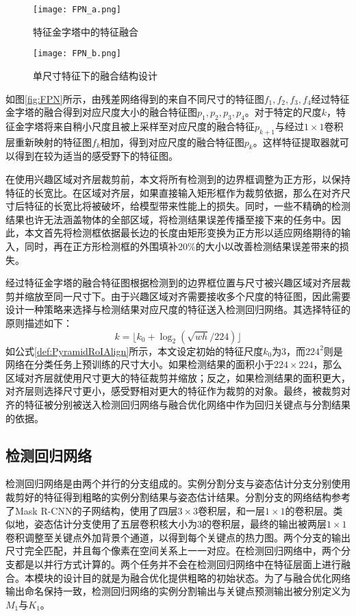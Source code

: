 \begin{figure*}[htbp]	
	\centering
	\begin{subfigure}[b]{0.4\textwidth}
		\texttt{[image: FPN\_a.png]}
		\caption{特征金字塔中的特征融合}
	\end{subfigure}
	\hskip1.5cm
	\begin{subfigure}[b]{0.4\textwidth}
		\texttt{[image: FPN\_b.png]}
		\caption{单尺寸特征下的融合结构设计}
	\end{subfigure}
	\caption{特征金字塔中的结构设计}
	\label{fig:FPN}
\end{figure*}

如图\ref{fig:FPN}所示，由残差网络得到的来自不同尺寸的特征图$f_1, f_2, f_3, f_4$经过特征金字塔的融合得到对应尺度大小的融合特征图$p_1, p_2, p_3, p_4$。对于特定的尺度$k$，特征金字塔将来自稍小尺度且被上采样至对应尺度的融合特征$p_{k+1}$与经过$1\times1$卷积层重新映射的特征图$f_k$相加，得到对应尺度的融合特征图$p_k$。这样特征提取器就可以得到在较为适当的感受野下的特征图。

在使用兴趣区域对齐层裁剪前，本文将所有检测到的边界框调整为正方形，以保持特征的长宽比。在区域对齐层，如果直接输入矩形框作为裁剪依据，那么在对齐尺寸后特征的长宽比将被破坏，给模型带来性能上的损失。同时，一些不精确的检测结果也许无法涵盖物体的全部区域，将检测结果误差传播至接下来的任务中。因此，本文首先将检测框依据最长边的长度由矩形变换为正方形以适应网络期待的输入，同时，再在正方形检测框的外围填补20\%的大小以改善检测结果误差带来的损失。

经过特征金字塔的融合特征图根据检测到的边界框位置与尺寸被兴趣区域对齐层裁剪并缩放至同一尺寸下。由于兴趣区域对齐需要接收多个尺度的特征图，因此需要设计一种策略来选择与检测结果对应尺度的特征送入检测回归网络。其选择特征的原则描述如下：
\begin{equation}
\label{def:PyramidRoIAlign}
k =\lfloor k_0 + \log_{2}(\sqrt{wh} / 224) \rfloor
\end{equation}
如公式\eqref{def:PyramidRoIAlign}所示，本文设定初始的特征尺度$k_0$为3，而$224^2$则是网络在分类任务上预训练的尺寸大小。如果检测结果的面积小于$224\times224$，那么区域对齐层就使用尺寸更大的特征裁剪并缩放；反之，如果检测结果的面积更大，对齐层则选择尺寸更小，感受野相对更大的特征作为裁剪的对象。最终，被裁剪对齐的特征被分别被送入检测回归网络与融合优化网络中作为回归关键点与分割结果的依据。

\subsection{检测回归网络}
\label{subsec:detection}
检测回归网络是由两个并行的分支组成的。实例分割分支与姿态估计分支分别使用裁剪好的特征得到粗略的实例分割结果与姿态估计结果。分割分支的网络结构参考了Mask R-CNN\cite{He2017Mask}的子网结构，使用了四层$3\times3$卷积层，和一层$1\times1$的卷积层。类似地，姿态估计分支使用了五层卷积核大小为3的卷积层，最终的输出被两层$1\times1$卷积调整至关键点外加背景个通道，以得到每个关键点的热力图。两个分支的输出尺寸完全匹配，并且每个像素在空间关系上一一对应。在检测回归网络中，两个分支都是以并行方式计算的。两个任务并不会在检测回归网络中在特征层面上进行融合。本模块的设计目的就是为融合优化提供粗略的初始状态。为了与融合优化网络输出命名保持一致，检测回归网络的实例分割输出与关键点预测输出被分别定义为$M_1$与$K_1$。

